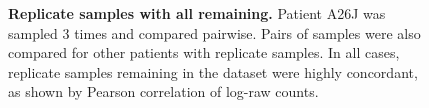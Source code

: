 \begin{figure}[!ht]
\begin{center}
%
%
    \end{center}
    \caption[Replicate samples with all remaining]{\small \textbf{Replicate samples with all remaining.} Patient A26J was sampled 3 times and compared pairwise. Pairs of samples were also compared for other patients with replicate samples.  In all cases, replicate samples remaining in the dataset were highly concordant, as shown by Pearson correlation of log-raw counts.
}
\label{fig:rep_keepkeep}
\end{figure}

\FloatBarrier

